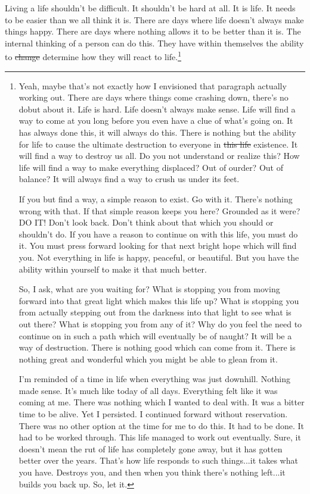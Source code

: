 Living a life shouldn't be difficult. It shouldn't be hard at all. It is life.
It needs to be easier than we all think it is. There are days where life doesn't
always make things happy. There are days where nothing allows it to be better
than it is. The internal thinking of a person can do this. They have within
themselves the ability to \st{change} determine how they will react to 
life.\footnote{
Yeah, maybe that's not exactly how I envisioned that paragraph actually working
out. There are days where things come crashing down, there's no dobut about it.
Life is hard. Life doesn't always make sense. Life will find a way to come at
you long before you even have a clue of what's going on. It has always done
this, it will always do this. There is nothing but the ability for life to cause
the ultimate destruction to everyone in \st{this life} existence. It will find 
a way to destroy us all. Do you not understand or realize this? How life will
find a way to make everything displaced? Out of ourder? Out of balance? It will
always find a way to crush us under its feet.

If you but find a way, a simple reason to exist. Go with it. There's nothing
wrong with that. If that simple reason keeps you here? Grounded as it were? DO
IT! Don't look back. Don't think about that which you should or shouldn't do. If
you have a reason to continue on with this life, you must do it. You must press
forward looking for that next bright hope which will find you. Not everything in
life is happy, peaceful, or beautiful. But you have the ability within yourself
to make it that much better.

So, I ask, what are you waiting for? What is stopping you from moving forward
into that great light which makes this life up? What is stopping you from
actually stepping out from the darkness into that light to see what is out
there? What is stopping you from any of it? Why do you feel the need to continue
on in such a path which will eventually be of naught? It will be a way of
destruction. There is nothing good which can come from it. There is nothing
great and wonderful which you might be able to glean from it.

I'm reminded of a time in life when everything was just downhill. Nothing made
sense. It's much like today of all days. Everything felt like it was coming at
me. There was nothing which I wanted to deal with. It was a bitter time to be
alive. Yet I persisted. I continued forward without reservation. There was no
other option at the time for me to do this. It had to be done. It had to be
worked through. This life managed to work out eventually. Sure, it doesn't mean
the rut of life has completely gone away, but it has gotten better over the
years. That's how life responds to such things...it takes what you have.
Destroys you, and then when you think there's nothing left...it builds you back
up. So, let it.
}

